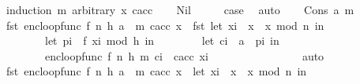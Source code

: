 \begin{isabellebody}
%
\isadelimproof
%
\endisadelimproof
%
\isatagproof
{}\isamarkupfalse%
\ {\isacharparenleft}{\kern0pt}induction\ m\ arbitrary{\isacharcolon}{\kern0pt}\ x\ c{\isacharunderscore}{\kern0pt}acc{\isacharparenright}{\kern0pt}\isanewline
\ \ \isamarkupfalse%
\ {\isacharparenleft}{\kern0pt}Nil{\isacharparenright}{\kern0pt}\isanewline
\ \ \isamarkupfalse%
\ \isamarkupfalse%
\ {\isacharquery}{\kern0pt}case\ \isamarkupfalse%
\ auto\isanewline
{}\isamarkupfalse%
\isanewline
\ \ \isamarkupfalse%
\ {\isacharparenleft}{\kern0pt}Cons\ a\ m{\isacharparenright}{\kern0pt}\isanewline
\ \ \isamarkupfalse%
\ {\isachardoublequoteopen}fst\ {\isacharparenleft}{\kern0pt}enc{\isacharunderscore}{\kern0pt}loop{\isacharunderscore}{\kern0pt}func\ {\isacharparenleft}{\kern0pt}f{\isacharcomma}{\kern0pt}\ n{\isacharcomma}{\kern0pt}\ h{\isacharcomma}{\kern0pt}\ {\isacharparenleft}{\kern0pt}a\ {\isacharhash}{\kern0pt}\ m{\isacharparenright}{\kern0pt}{\isacharparenright}{\kern0pt}\ c{\isacharunderscore}{\kern0pt}acc\ x{\isacharparenright}{\kern0pt}\ {\isacharequal}{\kern0pt}\ fst\ {\isacharparenleft}{\kern0pt}let\ x{\isacharunderscore}{\kern0pt}i\ {\isacharequal}{\kern0pt}\ x\ {\isacharasterisk}{\kern0pt}\ x\ mod\ n\ in\isanewline
\ \ \ \ \ \ \ \ let\ p{\isacharunderscore}{\kern0pt}i\ {\isacharequal}{\kern0pt}\ f\ {\isacharparenleft}{\kern0pt}x{\isacharunderscore}{\kern0pt}i\ mod\ {}{\isacharcircum}{\kern0pt}h{\isacharparenright}{\kern0pt}\ in\isanewline
\ \ \ \ \ \ \ \ let\ c{\isacharunderscore}{\kern0pt}i\ {\isacharequal}{\kern0pt}\ a\ {\isacharbrackleft}{\kern0pt}{\isasymoplus}{\isacharbrackright}{\kern0pt}\ p{\isacharunderscore}{\kern0pt}i\ in\isanewline
\ \ \ \ \ \ \ \ enc{\isacharunderscore}{\kern0pt}loop{\isacharunderscore}{\kern0pt}func\ {\isacharparenleft}{\kern0pt}f{\isacharcomma}{\kern0pt}\ n{\isacharcomma}{\kern0pt}\ h{\isacharcomma}{\kern0pt}\ m{\isacharparenright}{\kern0pt}\ {\isacharparenleft}{\kern0pt}c{\isacharunderscore}{\kern0pt}i\ {\isacharhash}{\kern0pt}\ c{\isacharunderscore}{\kern0pt}acc{\isacharparenright}{\kern0pt}\ x{\isacharunderscore}{\kern0pt}i\isanewline
\ \ \ \ \ \ \ \ {\isacharparenright}{\kern0pt}{\isachardoublequoteclose}\ \ \isanewline
\ \ \ \ \isamarkupfalse%
\ auto\isanewline
\ \ \isamarkupfalse%
\ \isamarkupfalse%
\ {\isachardoublequoteopen}fst\ {\isacharparenleft}{\kern0pt}enc{\isacharunderscore}{\kern0pt}loop{\isacharunderscore}{\kern0pt}func\ {\isacharparenleft}{\kern0pt}f{\isacharcomma}{\kern0pt}\ n{\isacharcomma}{\kern0pt}\ h{\isacharcomma}{\kern0pt}\ {\isacharparenleft}{\kern0pt}a\ {\isacharhash}{\kern0pt}\ m{\isacharparenright}{\kern0pt}{\isacharparenright}{\kern0pt}\ c{\isacharunderscore}{\kern0pt}acc\ x{\isacharparenright}{\kern0pt}\ {\isacharequal}{\kern0pt}\ {\isacharparenleft}{\kern0pt}let\ x{\isacharunderscore}{\kern0pt}i\ {\isacharequal}{\kern0pt}\ x\ {\isacharasterisk}{\kern0pt}\ x\ mod\ n\ in\isanewline

\end{isabellebody}
